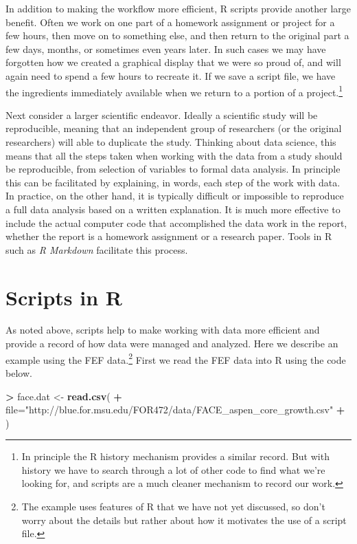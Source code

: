 \documentclass[]{krantz}
\makeatletter
\newenvironment{Shaded}{\begin{snugshade}}{\end{snugshade}}
\newcommand{\DataTypeTok}[1]{\textcolor[rgb]{0.27,0.27,0.27}{#1}}
\newcommand{\KeywordTok}[1]{\textcolor[rgb]{0.27,0.27,0.27}{\textbf{#1}}}
\newcommand{\NormalTok}[1]{#1}
\newcommand{\OperatorTok}[1]{\textcolor[rgb]{0.43,0.43,0.43}{\textbf{#1}}}
\newcommand{\StringTok}[1]{\textcolor[rgb]{0.5,0.5,0.5}{#1}}
\newenvironment{kframe}{%
\medskip{}
\setlength{\fboxsep}{.8em}
 \def\at@end@of@kframe{}%
 \ifinner\ifhmode%
  \def\at@end@of@kframe{\end{minipage}}%
  \begin{minipage}{\columnwidth}%
 \fi\fi%
 \def\FrameCommand##1{\hskip\@totalleftmargin \hskip-\fboxsep
 \colorbox{shadecolor}{##1}\hskip-\fboxsep
     \hskip-\linewidth \hskip-\@totalleftmargin \hskip\columnwidth}%
 \MakeFramed {\advance\hsize-\width
   \@totalleftmargin\z@ \linewidth\hsize
   \@setminipage}}%
 {\par\unskip\endMakeFramed%
 \at@end@of@kframe}
\renewenvironment{Shaded}{\begin{kframe}}{\end{kframe}}
\makeatother
\begin{document}
In addition to making the workflow more efficient, R scripts provide another large benefit. Often we work on one part of a homework assignment or project for a few hours, then move on to something else, and then return to the original part a few days, months, or sometimes even years later. In such cases we may have forgotten how we created a graphical display that we were so proud of, and will again need to spend a few hours to recreate it. If we save a script file, we have the ingredients immediately available when we return to a portion of a project.\footnote{In principle the R history mechanism provides a similar record. But with history we have to search through a lot of other code to find what we're looking for, and scripts are a much cleaner mechanism to record our work.}

Next consider a larger scientific endeavor. Ideally a scientific study will be reproducible, meaning that an independent group of researchers (or the original researchers) will able to duplicate the study. Thinking about data science, this means that all the steps taken when working with the data from a study should be reproducible, from selection of variables to formal data analysis. In principle this can be facilitated by explaining, in words, each step of the work with data. In practice, on the other hand, it is typically difficult or impossible to reproduce a full data analysis based on a written explanation. It is much more effective to include the actual computer code that accomplished the data work in the report, whether the report is a homework assignment or a research paper. Tools in R such as \emph{R Markdown} facilitate this process.

\hypertarget{scripts-in-r}{%
\section{Scripts in R}\label{scripts-in-r}}

As noted above, scripts help to make working with data more efficient and provide a record of how data were managed and analyzed. Here we describe an example using the FEF data.\footnote{The example uses features of R that we have not yet discussed, so don't worry about the details but rather about how it motivates the use of a script file.} First we read the FEF data into R using the code below.

\begin{Shaded}
\begin{Highlighting}[]
\OperatorTok{>}\StringTok{ }\NormalTok{face.dat <-}\StringTok{ }\KeywordTok{read.csv}\NormalTok{(}
\OperatorTok{+}\StringTok{     }\DataTypeTok{file=}\StringTok{"http://blue.for.msu.edu/FOR472/data/FACE_aspen_core_growth.csv"}
\OperatorTok{+}\StringTok{ }\NormalTok{)}
\end{Highlighting}
\end{Shaded}
\end{document}
